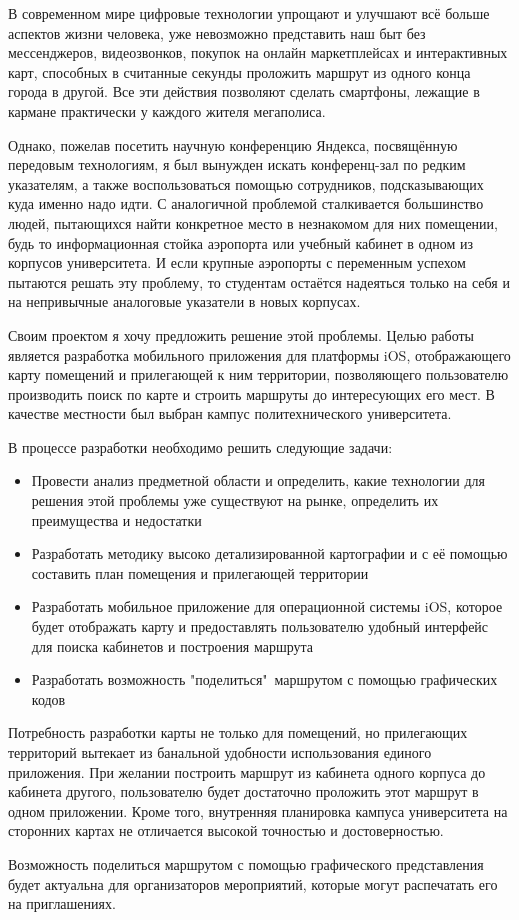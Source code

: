 В современном мире цифровые технологии упрощают и улучшают всё больше аспектов жизни человека, уже невозможно представить наш быт без мессенджеров, видеозвонков, покупок на онлайн маркетплейсах и интерактивных карт, способных в считанные секунды проложить маршрут из одного конца города в другой. Все эти действия позволяют сделать смартфоны, лежащие в кармане практически у каждого жителя мегаполиса.

Однако, пожелав посетить научную конференцию Яндекса, посвящённую передовым технологиям, я был вынужден искать конференц-зал по редким указателям, а также воспользоваться помощью сотрудников, подсказывающих куда именно надо идти. С аналогичной проблемой сталкивается большинство людей, пытающихся найти конкретное место в незнакомом для них помещении, будь то информационная стойка аэропорта или учебный кабинет в одном из корпусов университета.
И если крупные аэропорты с переменным успехом пытаются решать эту проблему, то студентам остаётся надеяться только на себя и на непривычные аналоговые указатели в новых корпусах.

Своим проектом я хочу предложить решение этой проблемы. Целью работы является разработка мобильного приложения для платформы iOS, отображающего карту помещений и прилегающей к ним территории, позволяющего пользователю производить поиск по карте и строить маршруты до интересующих его мест. В качестве местности был выбран кампус политехнического университета.

В процессе разработки необходимо решить следующие задачи:
\begin{itemize}
  \item Провести анализ предметной области и определить, какие технологии для решения этой проблемы уже существуют на рынке, определить их преимущества и недостатки
  \item Разработать методику высоко детализированной картографии и с её помощью составить план помещения и прилегающей территории
  \item Разработать мобильное приложение для операционной системы iOS, которое будет отображать карту и предоставлять пользователю удобный интерфейс для поиска кабинетов и построения маршрута
  \item Разработать возможность "поделиться"\ маршрутом с помощью графических кодов
\end{itemize}

Потребность разработки карты не только для помещений, но прилегающих территорий вытекает из банальной удобности использования единого приложения. При желании построить маршрут из кабинета одного корпуса до кабинета другого, пользователю будет достаточно проложить этот маршрут в одном приложении. Кроме того, внутренняя планировка кампуса университета на сторонних картах не отличается высокой точностью и достоверностью.

Возможность поделиться маршрутом с помощью графического представления будет актуальна для организаторов мероприятий, которые могут распечатать его на приглашениях.
